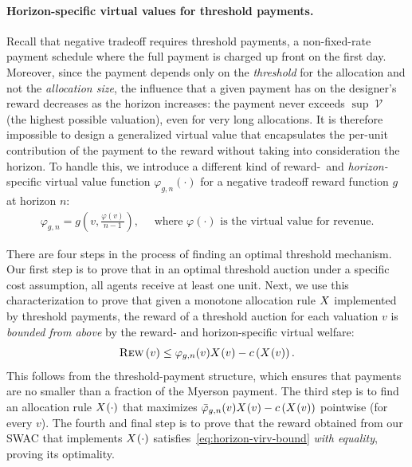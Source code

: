 \documentclass[11pt,letterpaper]{article}
\newcommand{\brackets}[1]{\left( #1 \right)}
\newcommand{\fr}{fixed-rate\xspace}
\newcommand{\swac}{SWAC\xspace}
\DeclareMathOperator{\V}{\mathcal{V}}
\newcommand{\g}{g}
\newcommand{\irn}{\Bar{\varphi}}
\theoremstyle{plain}
\begin{document}
\paragraph{Horizon-specific virtual values for threshold payments.}
Recall that negative tradeoff requires threshold payments, a non-\fr payment schedule where
the full payment is charged up front on the first day.
Moreover,
since the payment depends only on the \emph{threshold} for the allocation and not the \emph{allocation size}, the influence that a given payment has on the designer's reward decreases as the horizon increases:
the payment never exceeds $\sup \V$ (the highest possible valuation),
even for very long allocations.
%
It is therefore impossible to design a generalized virtual value
that
encapsulates the per-unit contribution of the payment to the reward
without taking into consideration the horizon.
To handle this, we introduce a different kind of reward-\ and \emph{horizon-}specific virtual value function $\varphi_{\g,n}(\cdot)$ for a negative tradeoff reward function $\g$ at horizon $n$:
\begin{align}
    \varphi_{\g,n}=\g\brackets{v,\frac{\varphi(v)}{n-1}},
    \quad \text{ where $\varphi(\cdot)$ is the virtual value for revenue.}
\end{align}

There are four steps in the process of finding an optimal threshold mechanism. 
Our first step is to prove that in an optimal threshold auction under a specific cost assumption, all agents receive at least one unit.
Next, we use this characterization to prove that given a monotone allocation rule $\alloc$ implemented by threshold payments, the reward of a threshold auction for each valuation $v$ is \emph{bounded from above} by the reward- and horizon-specific virtual welfare: 
\begin{equation}\label{eq:horizon-virv-bound}
    \trew{v}\leq\varphi_{\g,n}(v)\x{v}-c\brackets{\x{v}}.
\end{equation} This follows from the threshold-payment structure, which ensures that payments are no smaller than a fraction of the Myerson payment. 
The third step is to
find an allocation rule $\x{\cdot}$ that maximizes $\irn_{\g,n}(v)\x{v}-c\brackets{\x{v}}$ pointwise (for every $v$). 
The fourth and final step is to prove that 
the reward obtained from 
our \swac that implements $\x{\cdot}$
 satisfies~\eqref{eq:horizon-virv-bound} \emph{with equality},
proving its optimality.
\end{document}

